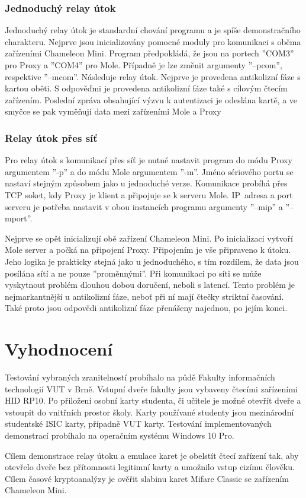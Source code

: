 \subsection*{Jednoduchý relay útok}
Jednoduchý relay útok je standardní chování programu a je spíše demonstračního charakteru. Nejprve jsou inicializovány pomocné moduly pro komunikaci s oběma zařízeními Chameleon Mini. Program předpokládá, že jsou na portech ''COM3'' pro Proxy a ''COM4'' pro Mole. Případně je lze změnit argumenty ''--pcom'', respektive ''--mcom''. Následuje relay útok. Nejprve je provedena antikolizní fáze s kartou oběti. S odpověďmi je provedena antikolizní fáze také s cílovým čtecím zařízením. Poslední zpráva obsahující výzvu k autentizaci je odeslána kartě, a ve smyčce se pak vyměňují data mezi zařízeními Mole a Proxy

\subsection*{Relay útok přes síť}
Pro relay útok s komunikací přes síť je nutné nastavit program do módu Proxy argumentem ''-p'' a do módu Mole argumentem ''-m''. Jméno sériového portu se nastaví stejným způsobem jako u jednoduché verze. Komunikace probíhá přes TCP soket, kdy Proxy je klient a připojuje se k serveru Mole. IP~adresa a port serveru je potřeba nastavit v obou instancích programu argumenty ''--mip'' a ''--mport''. \par
Nejprve se opět inicializují obě zařízení Chameleon Mini. Po inicializaci vytvoří Mole server a počká na připojení Proxy. Připojením je vše připraveno k útoku. Jeho logika je prakticky stejná jako u jednoduchého, s tím rozdílem, že data jsou posílána sítí a ne pouze ''proměnnými''. Při komunikaci po síti se může vyskytnout problém dlouhou dobou doručení, neboli s latencí. Tento problém je nejmarkantnější u antikolizní fáze, neboť při ní mají čtečky striktní časování. Také proto jsou odpovědi antikolizní fáze přenášeny najednou, po jejím konci.


    \chapter{Vyhodnocení}
Testování vybraných zranitelností probíhalo na půdě Fakulty informačních technologií VUT v Brně. Vstupní dveře fakulty jsou vybaveny čtecími zařízeními HID RP10\footnotemark. Po přiložení osobní karty studenta, či učitele je možné otevřít dveře a vstoupit do vnitřních prostor školy. Karty používané studenty jsou mezinárodní studentské ISIC karty, případně VUT karty. Testování implementovaných demonstrací probíhalo na operačním systému Windows 10 Pro.\par
Cílem demonstrace relay útoku a emulace karet je obelstít čtecí zařízení tak, aby otevřelo dveře bez přítomnosti legitimní karty a umožnilo vstup cizímu člověku. Cílem časové kryptoanalýzy je ověřit slabinu karet Mifare Classic se zařízením Chameleon Mini.

